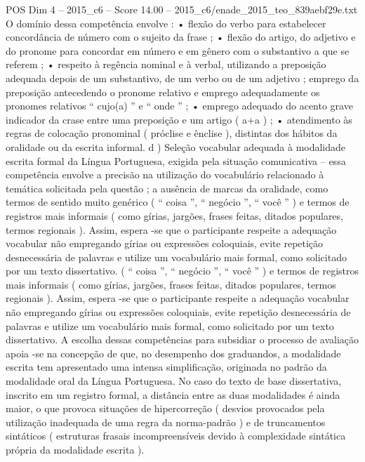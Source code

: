 \begin{textsample}{POS Dim 4 – 2015\_c6 – Score 14.00 – 2015\_c6/enade\_2015\_teo\_839aebf29e.txt}
O domínio dessa competência envolve : • flexão do verbo para estabelecer concordância de número com o sujeito da frase ; • flexão do artigo, do adjetivo e do pronome para concordar em número e em gênero com o substantivo a que se referem ; • respeito à regência nominal e à verbal, utilizando a preposição adequada depois de um substantivo, de um verbo ou de um adjetivo ; emprego da preposição antecedendo o pronome relativo e emprego adequadamente os pronomes relativos “ cujo(a) ” e “ onde ” ; • emprego adequado do acento grave indicador da crase entre uma preposição e um artigo ( a+a ) ; • atendimento às regras de colocação pronominal ( próclise e ênclise ), distintas dos hábitos da oralidade ou da escrita informal. d ) Seleção vocabular adequada à modalidade escrita formal da Língua Portuguesa, exigida pela situação comunicativa – essa competência envolve a precisão na utilização do vocabulário relacionado à temática solicitada pela questão ; a ausência de marcas da oralidade, como termos de sentido muito genérico ( “ coisa ”, “ negócio ”, “ você ” ) e termos de registros mais informais ( como gírias, jargões, frases feitas, ditados populares, termos regionais ).
Assim, espera -se que o participante respeite a adequação vocabular não empregando gírias ou expressões coloquiais, evite repetição desnecessária de palavras e utilize um vocabulário mais formal, como solicitado por um texto dissertativo. ( “ coisa ”, “ negócio ”, “ você ” ) e termos de registros mais informais ( como gírias, jargões, frases feitas, ditados populares, termos regionais ).
Assim, espera -se que o participante respeite a adequação vocabular não empregando gírias ou expressões coloquiais, evite repetição desnecessária de palavras e utilize um vocabulário mais formal, como solicitado por um texto dissertativo.
A escolha dessas competências para subsidiar o processo de avaliação apoia -se na concepção de que, no desempenho dos graduandos, a modalidade escrita tem apresentado uma intensa simplificação, originada no padrão da modalidade oral da Língua Portuguesa.
No caso do texto de base dissertativa, inscrito em um registro formal, a distância entre as duas modalidades é ainda maior, o que provoca situações de hipercorreção ( desvios provocados pela utilização inadequada de uma regra da norma-padrão ) e de truncamentos sintáticos ( estruturas frasais incompreensíveis devido à complexidade sintática própria da modalidade escrita ).

\end{textsample}
